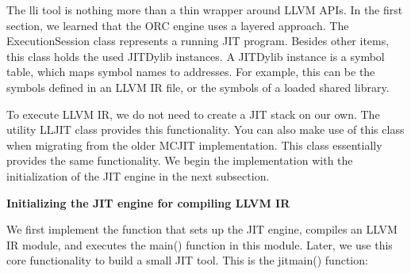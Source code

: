 The lli tool is nothing more than a thin wrapper around LLVM APIs. In the first section, we learned that the ORC engine uses a layered approach. The ExecutionSession class represents a running JIT program. Besides other items, this class holds the used JITDylib instances. A JITDylib instance is a symbol table, which maps symbol names to addresses. For example, this can be the symbols defined in an LLVM IR file, or the symbols of a loaded shared library.\par

To execute LLVM IR, we do not need to create a JIT stack on our own. The utility LLJIT class provides this functionality. You can also make use of this class when migrating from the older MCJIT implementation. This class essentially provides the same functionality. We begin the implementation with the initialization of the JIT engine in the next subsection.\par

\hspace*{\fill} \par %
\textbf{Initializing the JIT engine for compiling LLVM IR}

We first implement the function that sets up the JIT engine, compiles an LLVM IR module, and executes the main() function in this module. Later, we use this core functionality to build a small JIT tool. This is the jitmain() function:\par

